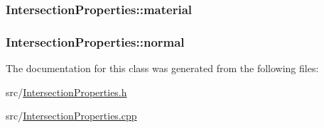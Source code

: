\subsubsection[{\texorpdfstring{material}{material}}]{ Intersection\+Properties\+::material}\hypertarget{classIntersectionProperties_a52218ae741a9cd035eeed6cbc40b3300}{}\label{classIntersectionProperties_a52218ae741a9cd035eeed6cbc40b3300}
\subsubsection[{\texorpdfstring{normal}{normal}}]{ Intersection\+Properties\+::normal}\hypertarget{classIntersectionProperties_afb99c699b3116580c68936d033b09081}{}\label{classIntersectionProperties_afb99c699b3116580c68936d033b09081}


The documentation for this class was generated from the following files\+:\begin{DoxyCompactItemize}
\item 
src/\hyperlink{IntersectionProperties_8h}{Intersection\+Properties.\+h}\item 
src/\hyperlink{IntersectionProperties_8cpp}{Intersection\+Properties.\+cpp}\end{DoxyCompactItemize}
